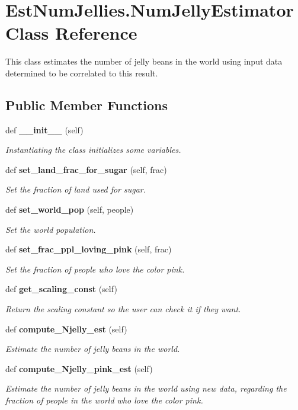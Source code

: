\section{Est\+Num\+Jellies.\+Num\+Jelly\+Estimator Class Reference}
\label{class_est_num_jellies_1_1_num_jelly_estimator}


This class estimates the number of jelly beans in the world using input data determined to be correlated to this result.  


\subsection*{Public Member Functions}
\begin{DoxyCompactItemize}
\item 
def {\bf \+\_\+\+\_\+init\+\_\+\+\_\+} (self)
\begin{DoxyCompactList}\small\item\em Instantiating the class initializes some variables. \end{DoxyCompactList}\item 
def {\bf set\+\_\+land\+\_\+frac\+\_\+for\+\_\+sugar} (self, frac)
\begin{DoxyCompactList}\small\item\em Set the fraction of land used for sugar. \end{DoxyCompactList}\item 
def {\bf set\+\_\+world\+\_\+pop} (self, people)
\begin{DoxyCompactList}\small\item\em Set the world population. \end{DoxyCompactList}\item 
def {\bf set\+\_\+frac\+\_\+ppl\+\_\+loving\+\_\+pink} (self, frac)
\begin{DoxyCompactList}\small\item\em Set the fraction of people who love the color pink. \end{DoxyCompactList}\item 
def {\bf get\+\_\+scaling\+\_\+const} (self)
\begin{DoxyCompactList}\small\item\em Return the scaling constant so the user can check it if they want. \end{DoxyCompactList}\item 
def {\bf compute\+\_\+\+Njelly\+\_\+est} (self)
\begin{DoxyCompactList}\small\item\em Estimate the number of jelly beans in the world. \end{DoxyCompactList}\item 
def {\bf compute\+\_\+\+Njelly\+\_\+pink\+\_\+est} (self)
\begin{DoxyCompactList}\small\item\em Estimate the number of jelly beans in the world using new data, regarding the fraction of people in the world who love the color pink. \end{DoxyCompactList}\end{DoxyCompactItemize}

